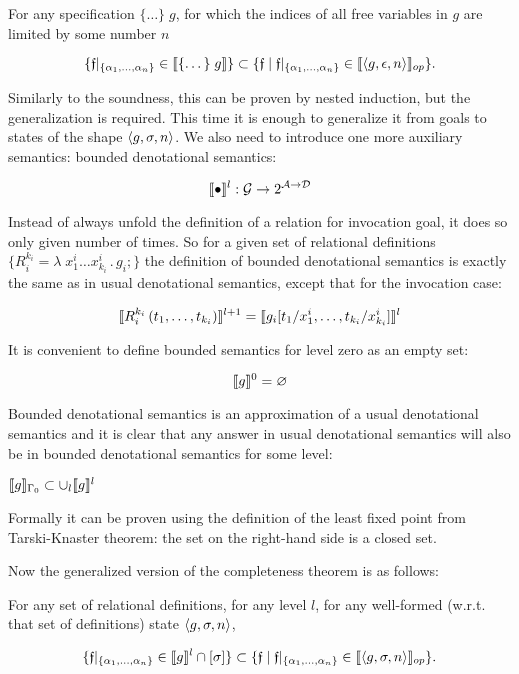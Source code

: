 \begin{theorem}
For any specification $\{\dots\}\; g$, for which the indices of all free variables in $g$ are limited by some number $n$

\[
\{\mathfrak{f}|_{\{\alpha_1,\dots,\alpha_n\}} \in \llbracket{\{\dots\}\; g}\rrbracket\} \subset \{\mathfrak{f} \mid \mathfrak{f}|_{\{\alpha_1,\dots,\alpha_n\}} \in \llbracket{\left<{g, \epsilon, n}\right>}\rrbracket_{op}\}.
\]
\end{theorem}


Similarly to the soundness, this can be proven by nested induction, but the generalization is required. This time it is enough to generalize it from goals
to states of the shape $\left<{g, \sigma, n}\right>$. We also need to introduce one more auxiliary semantics: bounded denotational semantics:

\[
\llbracket{\bullet}\rrbracket^l : \mathcal{G} \to 2^{\mathcal{A}\to\mathcal{D}}
\]

Instead of always unfold the definition of a relation for invocation goal, it does so only given number of times. So for a given set of relational
definitions $\{R_i^{k_i} = \lambda\;x_1^i\dots x_{k_i}^i\,.\, g_i;\}$ the definition of bounded denotational semantics is exactly the same as in usual denotational semantics,
except that for the invocation case:

\[
\llbracket{R_i^{k_i}\,(t_1,\dots,t_{k_i})}\rrbracket^{l+1} = \llbracket{g_i[t_1/x_1^i, \dots, t_{k_i}/x_{k_i}^i]}\rrbracket^{l}
\]

It is convenient to define bounded semantics for level zero as an empty set:

\[
\llbracket{g}\rrbracket^{0} = \varnothing
\]

Bounded denotational semantics is an approximation of a usual denotational semantics and it is clear that any answer in usual denotational semantics will also be in
bounded denotational semantics for some level:

\begin{lemma}
$\llbracket{g}\rrbracket_{\Gamma_0} \subset \cup_l \llbracket{g}\rrbracket^l$
\end{lemma}

Formally it can be proven using the definition of the least fixed point from Tarski-Knaster theorem: the set on the right-hand side is a closed set.

Now the generalized version of the completeness theorem is as follows:

\begin{lemma}
For any set of relational definitions, for any level $l$, for any well-formed (w.r.t. that set of definitions) state $\left<{g, \sigma, n}\right>$,

\[
\{\mathfrak{f}|_{\{\alpha_1,\dots,\alpha_n\}} \in \llbracket{g}\rrbracket^l \cap [\sigma]\} \subset \{\mathfrak{f} \mid \mathfrak{f}|_{\{\alpha_1,\dots,\alpha_n\}} \in \llbracket{\left<{g, \sigma, n}\right>}\rrbracket_{op}\}.
\]
\end{lemma}

